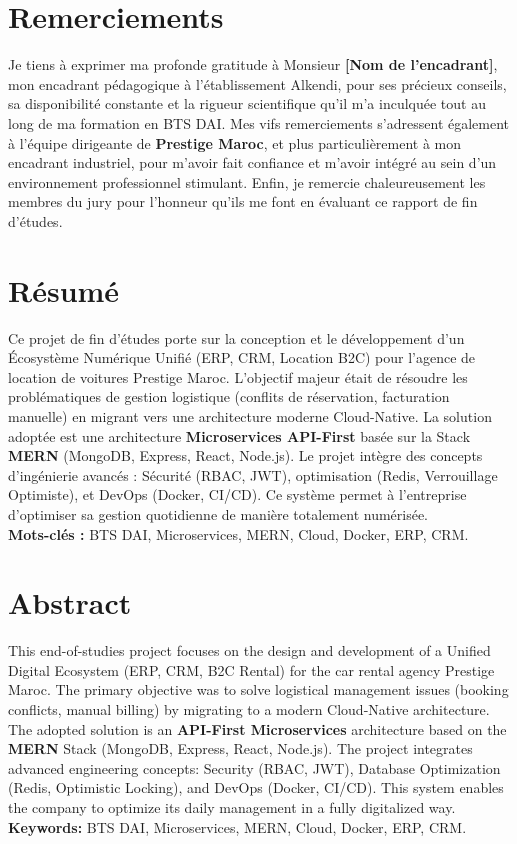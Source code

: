 \documentclass[12pt, a4paper]{report}
\begin{document}
\chapter*{Remerciements}
Je tiens à exprimer ma profonde gratitude à Monsieur \textbf{[Nom de l'encadrant]}, mon encadrant pédagogique à l'établissement Alkendi, pour ses précieux conseils, sa disponibilité constante et la rigueur scientifique qu'il m'a inculquée tout au long de ma formation en BTS DAI.
Mes vifs remerciements s'adressent également à l'équipe dirigeante de \textbf{Prestige Maroc}, et plus particulièrement à mon encadrant industriel, pour m'avoir fait confiance et m'avoir intégré au sein d'un environnement professionnel stimulant. Enfin, je remercie chaleureusement les membres du jury pour l'honneur qu'ils me font en évaluant ce rapport de fin d'études.

\chapter*{Résumé}
Ce projet de fin d'études porte sur la conception et le développement d'un Écosystème Numérique Unifié (ERP, CRM, Location B2C) pour l'agence de location de voitures Prestige Maroc. L'objectif majeur était de résoudre les problématiques de gestion logistique (conflits de réservation, facturation manuelle) en migrant vers une architecture moderne Cloud-Native.
La solution adoptée est une architecture \textbf{Microservices API-First} basée sur la Stack \textbf{MERN} (MongoDB, Express, React, Node.js). Le projet intègre des concepts d'ingénierie avancés : Sécurité (RBAC, JWT), optimisation (Redis, Verrouillage Optimiste), et DevOps (Docker, CI/CD). Ce système permet à l'entreprise d'optimiser sa gestion quotidienne de manière totalement numérisée. \\
\textbf{Mots-clés :} BTS DAI, Microservices, MERN, Cloud, Docker, ERP, CRM.

\chapter*{Abstract}
This end-of-studies project focuses on the design and development of a Unified Digital Ecosystem (ERP, CRM, B2C Rental) for the car rental agency Prestige Maroc. The primary objective was to solve logistical management issues (booking conflicts, manual billing) by migrating to a modern Cloud-Native architecture.
The adopted solution is an \textbf{API-First Microservices} architecture based on the \textbf{MERN} Stack (MongoDB, Express, React, Node.js). The project integrates advanced engineering concepts: Security (RBAC, JWT), Database Optimization (Redis, Optimistic Locking), and DevOps (Docker, CI/CD). This system enables the company to optimize its daily management in a fully digitalized way. \\
\textbf{Keywords:} BTS DAI, Microservices, MERN, Cloud, Docker, ERP, CRM.
\end{document}
